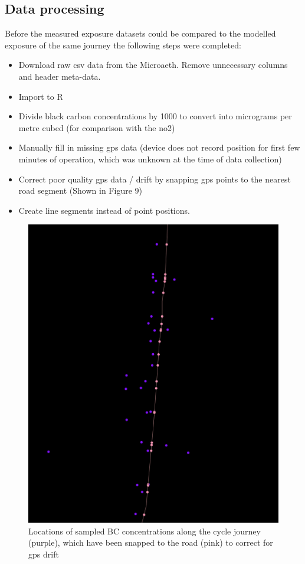 \subsection{Data processing}
\label{subsec:dataprocessing}

Before the measured exposure datasets could be compared to the modelled exposure of the same journey the following steps were completed:

\begin{itemize}
    \item Download raw \gls{csv} data from the Microaeth. Remove unnecessary columns and header meta-data.
    \item Import to R
    \item Divide black carbon concentrations by 1000 to convert into micrograms per metre cubed (for comparison with the \gls{no2})
    \item Manually fill in missing \gls{gps} data (device does not record position for first few minutes of operation, which was unknown at the time of data collection)
    \item Correct poor quality \gls{gps} data / drift by snapping \gls{gps} points to the nearest road segment (Shown in Figure 9)
    \item Create line segments instead of point positions.
\end{itemize}

\begin{figure}[H]
\centering
\includegraphics[scale=0.4]{images/snapping_cycle_to_road.png}
\caption{Locations of sampled BC concentrations along the cycle journey (purple), which have been snapped to the road (pink) to correct for \gls{gps} drift}
\label{fig:snapping_cycle_to_road}
\end{figure}

